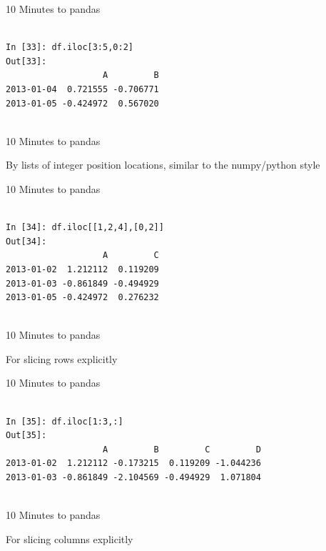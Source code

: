 \documentclass{beamer}
\begin{document}
\begin{frame}[t,fragile]{10 Minutes to pandas}


	\scriptsize
\begin{verbatim}

In [33]: df.iloc[3:5,0:2]
Out[33]: 
                   A         B
2013-01-04  0.721555 -0.706771
2013-01-05 -0.424972  0.567020


\end{verbatim}


\end{frame}


\begin{frame}[t]{10 Minutes to pandas}

By lists of integer position locations, similar to the numpy/python style

\end{frame}


\begin{frame}[t,fragile]{10 Minutes to pandas}


	\scriptsize
\begin{verbatim}

In [34]: df.iloc[[1,2,4],[0,2]]
Out[34]: 
                   A         C
2013-01-02  1.212112  0.119209
2013-01-03 -0.861849 -0.494929
2013-01-05 -0.424972  0.276232


\end{verbatim}


\end{frame}


\begin{frame}[t]{10 Minutes to pandas}

For slicing rows explicitly

\end{frame}


\begin{frame}[t,fragile]{10 Minutes to pandas}


	\scriptsize
\begin{verbatim}

In [35]: df.iloc[1:3,:]
Out[35]: 
                   A         B         C         D
2013-01-02  1.212112 -0.173215  0.119209 -1.044236
2013-01-03 -0.861849 -2.104569 -0.494929  1.071804


\end{verbatim}


\end{frame}


\begin{frame}[t]{10 Minutes to pandas}

For slicing columns explicitly

\end{frame}
\end{document}
